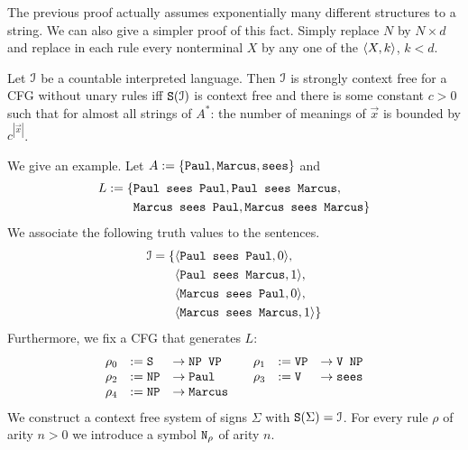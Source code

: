 The previous proof actually assumes exponentially many 
different structures to a string. We can also give a simpler 
proof of this fact. Simply replace $N$ by $N \times d$ and 
replace in each rule every nonterminal $X$ by any one of the 
$\langle X, k\rangle$, $k < d$.
\begin{thm}
\label{thm:bound}
Let $\mathcal{I}$ be a countable interpreted language. Then $\mathcal{I}$ is strongly
context free for a CFG without unary rules iff $\mbox{\tt S}(\mathcal{I})$
is context free and there is some constant $c > 0$ such that for almost 
all strings of $A^{\ast}$: the number of meanings of $\vec{x}$ is 
bounded by $c^{|\vec{x}|}$.
\end{thm}
We give an example.  Let $A := \{\mbox{\tt Paul}, \mbox{\tt Marcus}, 
\mbox{\tt sees}\}$ and
\begin{align}
\begin{split}
L := \{ & \mbox{\tt Paul sees Paul}, \mbox{\tt Paul sees Marcus}, \\
    & \mbox{\tt Marcus sees Paul}, \mbox{\tt Marcus sees Marcus}\}
\end{split}
\end{align}
We associate the following truth values to the sentences.
\begin{align}
\begin{split}
\mathcal{I} = \{  & \langle \mbox{\tt Paul sees Paul}, 0\rangle, \\
          & \langle \mbox{\tt Paul sees Marcus}, 1\rangle, \\
          & \langle \mbox{\tt Marcus sees Paul}, 0\rangle, \\
          & \langle \mbox{\tt Marcus sees Marcus},1\rangle\}
\end{split}
\end{align}
Furthermore, we fix a CFG that generates $L$:
\begin{equation}
\begin{array}{lll@{\qquad}lll}
\rho_0 & := \mbox{\tt S} & \pf \mbox{\tt NP VP} 
	& \rho_1 & := \mbox{\tt VP} & \pf \mbox{\tt V NP} \\
\rho_2 & := \mbox{\tt NP} & \pf \mbox{\tt Paul} 
	& \rho_3 & := \mbox{\tt V} & \pf \mbox{\tt sees} \\
\rho_4 & := \mbox{\tt NP} & \pf \mbox{\tt Marcus} & &  
\end{array}
\end{equation}
We construct a context free system of signs $\Sigma$ with
$\mbox{\tt S}(\Sigma) = \mathcal{I}$. For every rule $\rho$ of arity 
$n > 0$ we introduce a symbol $\mbox{\tt N}_{\rho}$ of arity $n$. 
